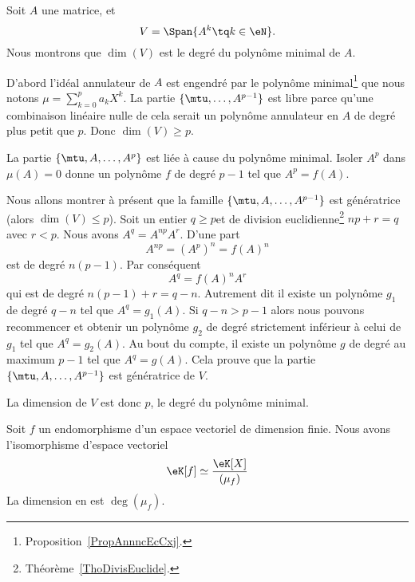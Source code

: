 \begin{example}
    Soit \( A\) une matrice, et
    \begin{equation}
        V=\Span\{A^k\tq k\in \eN \}.
    \end{equation}
    Nous montrons que \( \dim(V)\) est le degré du polynôme minimal de \( A\).

    D'abord l'idéal annulateur de \( A\) est engendré par le polynôme minimal\footnote{Proposition~\ref{PropAnnncEcCxj}.} que nous notons
        $\mu=\sum_{k=0}^pa_kX^k$.
    La partie \( \{ \mtu,\ldots, A^{p-1} \}\) est libre parce qu'une combinaison linéaire nulle de cela serait un polynôme annulateur en \( A\) de degré plus petit que \( p\). Donc \( \dim(V)\geq p\).

    La partie \( \{ \mtu,A,\ldots, A^p \}\) est liée à cause du polynôme minimal. Isoler \( A^p\) dans \( \mu(A)=0\) donne un polynôme \( f\) de degré \( p-1\) tel que \( A^p=f(A)\).

    Nous allons montrer à présent que la famille \( \{ \mtu,A,\ldots, A^{p-1} \}\) est génératrice (alors \( \dim(V)\leq p\)). Soit un entier \( q\geq p\)et de division euclidienne\footnote{Théorème~\ref{ThoDivisEuclide}.} \( np+r=q\) avec \( r<p\). Nous avons \( A^q=A^{np}A^r\). D'une part
    \begin{equation}
        A^{np}=(A^p)^n=f(A)^n
    \end{equation}
    est de degré \( n(p-1)\). Par conséquent
    \begin{equation}
        A^q=f(A)^nA^r
    \end{equation}
    qui est de degré \( n(p-1)+r=q-n\). Autrement dit il existe un polynôme \( g_1\) de degré \( q-n\) tel que \( A^q=g_1(A)\). Si \( q-n>p-1\) alors nous pouvons recommencer et obtenir un polynôme \( g_2\) de degré strictement inférieur à celui de \( g_1\) tel que \( A^q=g_2(A)\). Au bout du compte, il existe un polynôme \( g\) de degré au maximum \( p-1\) tel que \( A^q=g(A)\). Cela prouve que la partie \( \{ \mtu,A,\ldots, A^{p-1} \}\) est génératrice de \( V\).

    La dimension de \( V\) est donc \( p\), le degré du polynôme minimal.
\end{example}

\begin{proposition}     \label{PropooCFZDooROVlaA}
    Soit \( f\) un endomorphisme d'un espace vectoriel de dimension finie. Nous avons l'isomorphisme d'espace vectoriel
    \begin{equation}
        \eK[f]\simeq\frac{ \eK[X] }{ (\mu_f) }
    \end{equation}
    La dimension en est \( \deg(\mu_f)\).
\end{proposition}


